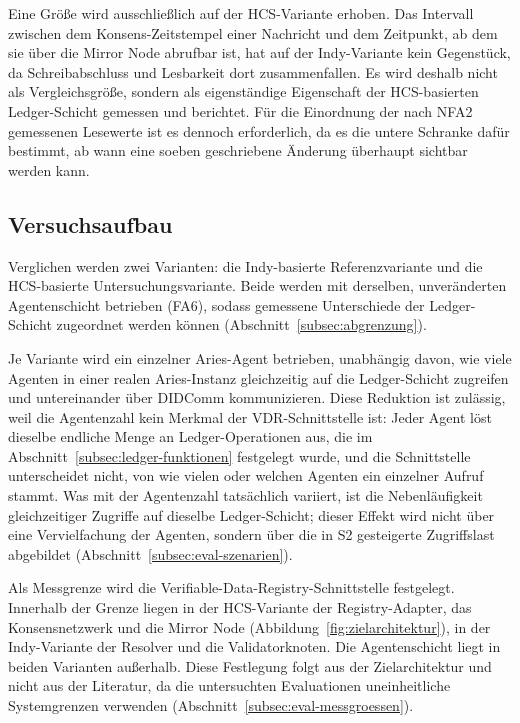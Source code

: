 Eine Größe wird ausschließlich auf der HCS-Variante erhoben. Das Intervall zwischen dem Konsens-Zeitstempel einer Nachricht und dem Zeitpunkt, ab dem sie über die Mirror Node abrufbar ist, hat auf der Indy-Variante kein Gegenstück, da Schreibabschluss und Lesbarkeit dort zusammenfallen. Es wird deshalb nicht als Vergleichsgröße, sondern als eigenständige Eigenschaft der HCS-basierten Ledger-Schicht gemessen und berichtet. Für die Einordnung der nach NFA2 gemessenen Lesewerte ist es dennoch erforderlich, da es die untere Schranke dafür bestimmt, ab wann eine soeben geschriebene Änderung überhaupt sichtbar werden kann.

\subsection{Versuchsaufbau}
\label{subsec:eval-aufbau}

Verglichen werden zwei Varianten: die Indy-basierte Referenzvariante und die HCS-basierte Untersuchungsvariante. Beide werden mit derselben, unveränderten Agentenschicht betrieben (FA6), sodass gemessene Unterschiede der Ledger-Schicht zugeordnet werden können (Abschnitt~\ref{subsec:abgrenzung}).

Je Variante wird ein einzelner Aries-Agent betrieben, unabhängig davon, wie viele Agenten in einer realen Aries-Instanz gleichzeitig auf die Ledger-Schicht zugreifen und untereinander über DIDComm kommunizieren. Diese Reduktion ist zulässig, weil die Agentenzahl kein Merkmal der VDR-Schnittstelle ist: Jeder Agent löst dieselbe endliche Menge an Ledger-Operationen aus, die im Abschnitt~\ref{subsec:ledger-funktionen} festgelegt wurde, und die Schnittstelle unterscheidet nicht, von wie vielen oder welchen Agenten ein einzelner Aufruf stammt. Was mit der Agentenzahl tatsächlich variiert, ist die Nebenläufigkeit gleichzeitiger Zugriffe auf dieselbe Ledger-Schicht; dieser Effekt wird nicht über eine Vervielfachung der Agenten, sondern über die in S2 gesteigerte Zugriffslast abgebildet (Abschnitt~\ref{subsec:eval-szenarien}).

Als Messgrenze wird die Verifiable-Data-Registry-Schnittstelle festgelegt. Innerhalb der Grenze liegen in der HCS-Variante der Registry-Adapter, das Konsensnetzwerk und die Mirror Node (Abbildung~\ref{fig:zielarchitektur}), in der Indy-Variante der Resolver und die Validatorknoten. Die Agentenschicht liegt in beiden Varianten außerhalb. Diese Festlegung folgt aus der Zielarchitektur und nicht aus der Literatur, da die untersuchten Evaluationen uneinheitliche Systemgrenzen verwenden (Abschnitt~\ref{subsec:eval-messgroessen}).

